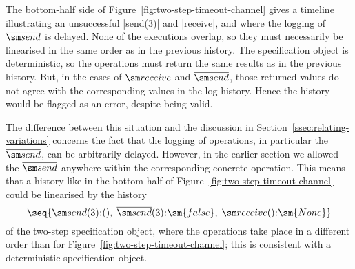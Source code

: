 
The bottom-half side of Figure~\ref{fig:two-step-timeout-channel} gives a
timeline illustrating an unsuccessful |send(3)| and |receive|, and where the
logging of $\overline{\send}$ is delayed.  None of the executions overlap, so
they must necessarily be linearised in the same order as in the previous
history.  The specification object is deterministic, so the operations must
return the same results as in the previous history.  But, in the cases of
$\receive$ and $\overline{\send}$, those returned values do not agree with the
corresponding values in the log history.  Hence the history would be flagged
as an error, despite being valid.

The difference between this situation and the discussion in
Section~\ref{ssec:relating-variations} concerns the fact that the logging of
operations, in particular the $\overline{\send}$, can be arbitrarily delayed.
However, in the earlier section we allowed the $\overline{\send}$ anywhere
within the corresponding concrete operation.  This means that a history like
in the bottom-half of Figure~\ref{fig:two-step-timeout-channel} could be
linearised by the history
\[
\seq{ \send(3)\::(),\; \overline{\send}(3)\::\sm{false},\;
  \receive()\::\sm{None} }
\]
of the two-step specification object, where the operations take place in a
different order than for Figure~\ref{fig:two-step-timeout-channel}; this is
consistent with a deterministic specification object.
